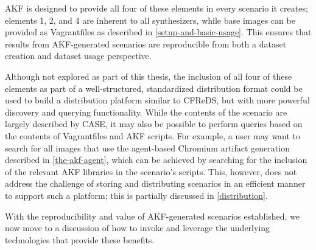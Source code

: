 AKF is designed to provide all four of these elements in every scenario
it creates; elements 1, 2, and 4 are inherent to all synthesizers, while
base images can be provided as Vagrantfiles as described in \autoref{setup-and-basic-usage}. This ensures that
results from AKF-generated scenarios are reproducible from both a
dataset creation and dataset usage perspective.

Although not explored as part of this thesis, the inclusion of all four
of these elements as part of a well-structured, standardized
distribution format could be used to build a distribution platform
similar to CFReDS, but with more powerful discovery and querying
functionality. While the contents of the scenario are largely described
by CASE, it may also be possible to perform queries based on the
contents of Vagrantfiles and AKF scripts. For example, a user may want
to search for all images that use the agent-based Chromium artifact
generation described in \autoref{the-akf-agent}, which can be achieved by searching for the inclusion of the
relevant AKF libraries in the scenario's scripts. This, however, does
not address the challenge of storing and distributing scenarios in an
efficient manner to support such a platform; this is partially discussed
in \autoref{distribution}.

With the reproducibility and value of AKF-generated scenarios
established, we now move to a discussion of how to invoke and leverage
the underlying technologies that provide these benefits.
